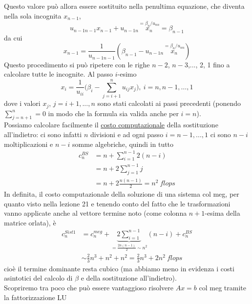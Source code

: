 Questo valore può allora essere sostituito nella penultima equazione, che diventa nella sola incognita $x_{n-1}$,
\[
u_{n-1n-1}x_{n-1}+u_{n-1n}\overset{=\beta_n/u_{nn}}{x_n}=\beta_{n-1}
\]
da cui 
\[x_{n-1}=\frac{1}{u_{n-1n-1}}(\beta_{n-1}-u_{n-1n}\overset{=\beta_n/u_{nn}}{x_n})
\]
Questo procedimento si può ripetere con le righe $n-2$, $n-3$,..., 2, 1 fino a calcolare tutte le incognite. Al passo $i$-esimo
\begin{equation*}
    x_i = \frac{1}{u_{ii}} \biggl( \beta_i - \sum_{j=i+1}^n u_{ij}x_j \biggr), \ i=n,n-1,\dots,1
\end{equation*}
dove i valori $x_j$, $j=i+1,...,n$ sono stati calcolati ai passi precedenti (ponendo $\sum_{j=n+1}^n = 0$ in modo che la formula sia valida anche per $i=n$). \\
Possiamo calcolare facilmente il \uline{costo computazionale} della sostituzione all'indietro: ci sono infatti $n$ divisioni e ad ogni passo $i=n-1,...,1$ ci sono $n-i$ moltiplicazioni e $n-i$ somme algebriche, quindi in tutto
\begin{equation*}
    \begin{split}
        c_n^{BS} & = n + \sum_{i=1}^{n-1} 2(n-i) \\
                 & = n + 2\sum_{j=1}^{n-1} j \\
                 & = n + 2\frac{n(n-1)}{2} = n^2 \ flops
    \end{split}
\end{equation*}
In definita, il costo computazionale della soluzione di una sistema col meg, per quanto visto nella lezione 21 e tenendo conto del fatto che le trasformazioni vanno applicate anche al vettore termine noto (come colonna $n+1$-esima della matrice orlata), è 
\begin{equation*}
    \begin{split}
        c_n^{Sist1} & = c_n^{meg} + \underbrace{2\sum_{i=1}^{n-1}}_{=\frac{2n(n-1)}{2}\sim n^2} (n-i) + c_n^{BS} \\
        & \sim \frac{2}{3}n^3 + n^2 + n^2 = \frac{2}{3}n^3 + 2n^2 \ flops
    \end{split}
\end{equation*}
cioè il termine dominante resta cubico (ma abbiamo meno in evidenza i costi asintotici del calcolo di $\beta$ e della sostituzione all'indietro). \\
Scopriremo tra poco che può essere vantaggioso risolvere $Ax=b$ col meg tramite la fattorizzazione LU


